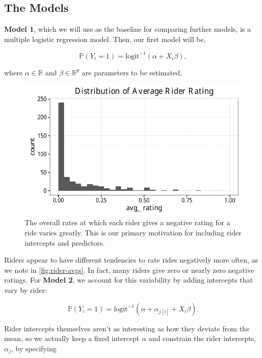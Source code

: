 \documentclass[]{article}
\begin{document}
\subsection{The Models}\label{the-models}

\textbf{Model 1}, which we will use as the baseline for comparing
further models, is a multiple logistic regression model. Then, our first
model will be,

\[ \mathbb{P} (Y_i=1) = \text{logit}^{-1} (\alpha + X_i \beta),\]

where \(\alpha \in \mathbb{R}\) and \(\beta \in \mathbb{R}^p\) are
parameters to be estimated.

\begin{figure}[tbh]
\centering
\includegraphics[angle = 0,scale = 1]{figure/rider_avgs.pdf}
\caption[The overall rates at which each rider gives a negative rating for a
ride varies greatly. This is our primary motivation for including rider intercepts
and predictors.]{\normalsize{The overall rates at which each rider gives a negative rating for a
ride varies greatly. This is our primary motivation for including rider intercepts
and predictors.}}
\label{fig:rider-avgs}
\end{figure}

Riders appear to have different tendencies to rate rides negatively more
often, as we note in \autoref{fig:rider-avgs}. In fact, many riders give
zero or nearly zero negative ratings. For \textbf{Model 2}, we account
for this variability by adding intercepts that vary by rider:

\[ \mathbb{P} (Y_i=1) = \text{logit}^{-1} (\alpha + \alpha_{j[i]} + X_i \beta).\]

Rider intercepts themselves aren't as interesting as how they deviate
from the mean, so we actually keep a fixed intercept \(\alpha\) and
constrain the rider intercepts, \(\alpha_j\), by specifying
\end{document}
